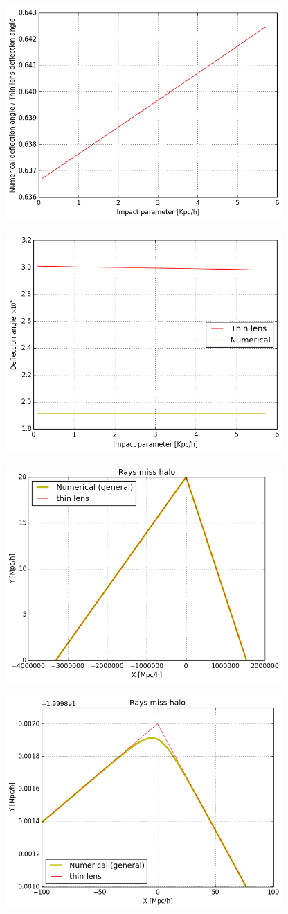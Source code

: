 \documentclass{article}
\begin{document}
\includegraphics[width=300pt]{u1.png}

\includegraphics[width=300pt]{u2.png} 

\includegraphics[width=300pt]{missing_the_lens.png} 

\includegraphics[width=300pt]{missing_the_lens_zoom.png} 
\end{document}
